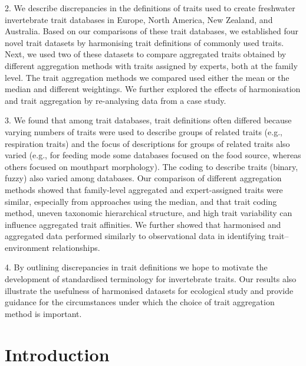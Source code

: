 \documentclass{article}
\begin{document}
2. We describe discrepancies in the definitions of traits used to create freshwater invertebrate trait databases in Europe, North America, New Zealand, and Australia. Based on our comparisons of these trait databases, we established four novel trait datasets by harmonising trait definitions of commonly used traits. Next, we used two of these datasets to compare aggregated traits obtained by different aggregation methods with traits assigned by experts, both at the family level. The trait aggregation methods we compared used either the mean or the median and different weightings. %
We further explored the effects of harmonisation and trait aggregation by re-analysing data from a case study.

3. We found that among trait databases, trait definitions often differed because varying numbers of traits were used to describe groups of related traits (e.g., respiration traits) and the focus of descriptions for groups of related traits also varied (e.g., for feeding mode some databases focused on the food source, whereas others focused on mouthpart morphology). The coding to describe traits (binary, fuzzy) also varied among databases. Our comparison of different aggregation methods showed that family-level aggregated and expert-assigned traits were similar, especially from approaches using the median, and that trait coding method, uneven taxonomic hierarchical structure, and high trait variability can influence aggregated trait affinities. We further showed that harmonised and aggregated data performed similarly to observational data in identifying trait–environment relationships.

4. By outlining discrepancies in trait definitions we hope to motivate the development of standardised terminology for invertebrate traits. Our results also illustrate the usefulness of harmonised datasets for ecological study and provide guidance for the circumstances under which the choice of trait aggregation method is important.


\newpage

\section*{Introduction}
\end{document}
